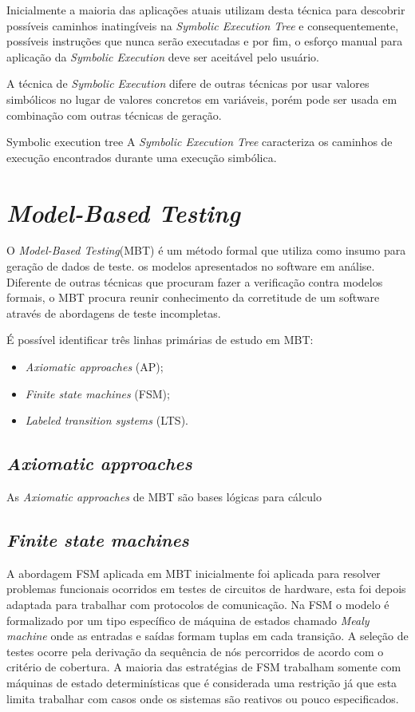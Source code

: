 \documentclass[
	12pt,				%
	oneside,			%
	a4paper,			%
	english,			%
	brazil				%
	]{abntex2ppgsi}
\begin{document}
Inicialmente a maioria das aplicações atuais utilizam desta técnica para descobrir possíveis caminhos inatingíveis na \textit{Symbolic Execution Tree} e consequentemente, possíveis instruções que nunca serão executadas e por fim, o esforço manual para aplicação da \textit{Symbolic Execution} deve ser aceitável pelo usuário.

A técnica de \textit{Symbolic Execution} difere de outras técnicas por usar valores simbólicos no lugar de valores concretos em variáveis, porém pode ser usada em combinação com outras técnicas de geração.





Symbolic execution tree
A \textit{Symbolic Execution Tree} caracteriza os caminhos de execução encontrados durante uma execução simbólica.


\section{\textit{Model-Based Testing}}
O \textit{Model-Based Testing}(MBT) é um método formal que utiliza como insumo para geração de dados de teste. os modelos apresentados no software em análise.
Diferente de outras técnicas que procuram fazer a verificação contra modelos formais, o MBT procura reunir conhecimento da corretitude de um software através de abordagens de teste incompletas.

É possível identificar três linhas primárias de estudo em MBT:

\begin{itemize}
	\item \textit{Axiomatic approaches} (AP);
	\item \textit{Finite state machines} (FSM);
	\item \textit{Labeled transition systems} (LTS).
\end{itemize}

\subsection{\textit{Axiomatic approaches}}
As \textit{Axiomatic approaches} de MBT são bases lógicas para cálculo

\subsection{\textit{Finite state machines}}
A abordagem FSM aplicada em MBT inicialmente foi aplicada para resolver problemas funcionais ocorridos em testes de circuitos de hardware, esta foi depois adaptada para trabalhar com protocolos de comunicação.
Na FSM o modelo é formalizado por um tipo específico de máquina de estados chamado \textit{Mealy machine} onde as entradas e saídas formam tuplas em cada transição. A seleção de testes ocorre pela derivação da sequência de nós percorridos de acordo com o critério de cobertura. A maioria das estratégias de FSM trabalham somente com máquinas de estado determinísticas que é considerada uma restrição já que esta limita trabalhar com casos onde os sistemas são reativos ou pouco especificados.
\end{document}
